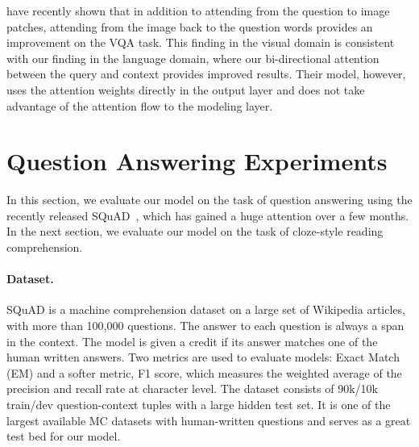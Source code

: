\documentclass{article} \usepackage{iclr2017_conference,times}
\begin{document}
\citet{lu2016hierarchical} have recently shown that in addition to attending from the question to image patches, attending from the image back to the question words provides an improvement on the VQA task. This finding in the visual domain is consistent with our finding in the language domain, where our bi-directional attention between the query and context provides improved results. 
Their model, however, uses the attention weights directly in the output layer and does not take advantage of the attention flow to the modeling layer. 
 
\section{Question Answering Experiments}\label{sec:squad}
In this section, we evaluate our model on the task of question answering using the recently released SQuAD~\citep{rajpurkar2016squad}, which has gained a huge attention over a few months. In the next section, we evaluate our model on the task of cloze-style reading comprehension. 


\paragraph{Dataset.}
SQuAD is a machine comprehension dataset on a large set of Wikipedia articles, with more than 100,000 questions. The answer to each question is always a span in the context. 
The model is given a credit if its answer matches one of the human written answers.  
Two metrics are used to evaluate models: Exact Match (EM) and a softer metric, F1 score, which measures the weighted average of the precision and recall rate at character level. 
The dataset consists of 90k/10k train/dev question-context tuples with a large hidden test set. 
It is one of the largest available MC datasets with human-written questions and serves as a great test bed for our model.
\end{document}
